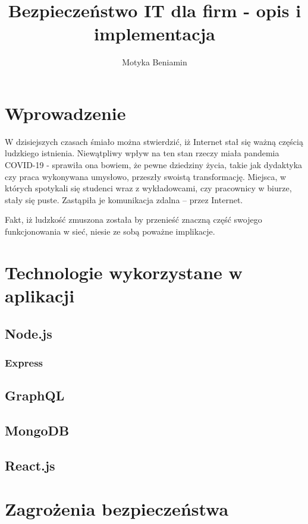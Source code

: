 \documentclass[12pt,twoside]{article}
\author{Motyka Beniamin}
\title{Bezpieczeństwo IT dla firm - opis i implementacja}
\begin{document}
\maketitle

\blankpage

\tableofcontents

\clearpage
\blankpage

\clearpage
\section{Wprowadzenie}
W dzisiejszych czasach śmiało można stwierdzić, iż	Internet stał się ważną częścią ludzkiego istnienia. Niewątpliwy wpływ na ten stan rzeczy miała pandemia COVID-19 - sprawiła ona bowiem, że pewne dziedziny życia, takie jak dydaktyka czy praca wykonywana umysłowo, przeszły swoistą transformację. Miejsca, w których spotykali się studenci wraz z wykładowcami, czy pracownicy w biurze, stały się puste. Zastąpiła je komunikacja zdalna -- przez Internet.

Fakt, iż ludzkość zmuszona została by przenieść znaczną część swojego funkcjonowania w sieć, niesie ze sobą poważne implikacje.

\clearpage
\section{Technologie wykorzystane w aplikacji}

\subsection{Node.js}
\subsubsection{Express}
\subsection{GraphQL}
\subsection{MongoDB}
\subsection{React.js}

\clearpage
\section{Zagrożenia bezpieczeństwa}
\end{document}
